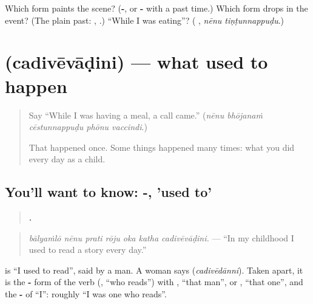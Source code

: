 \begin{tcolorbox}[breakable,colback=teal!4,colframe=teal!35!black,title={Before you move on}]
Which form paints the scene? (\textbf{-}, or \textbf{-} with a past time.) Which form drops in the event? (The plain past: \textbf{}, \textbf{}.) \textquotedblleft{}While I was eating\textquotedblright{}? (\textbf{ }, \emph{nēnu tiṇṭunnappuḍu}.)
\end{tcolorbox}
\section[\texorpdfstring{\te{చదివేవాడిని} (cadivēvāḍini)}{చదివేవాడిని (cadivēvāḍini)}]{ (cadivēvāḍini) — what used to happen}

\label{lesson:TE-C316-cadivevadini}



\begin{quote}
Say \textquotedblleft{}While I was having a meal, a call came.\textquotedblright{} (\emph{nēnu bhōjanaṁ cēstunnappuḍu phōnu vaccindi}.)

That happened once. Some things happened many times: what you did every day as a child.
\end{quote}

\subsection*{You'll want to know: -, 'used to'}
\begin{quote}
\textbf{      .}
\end{quote}

\begin{quote}
\emph{bālyaṁlō nēnu prati rōju oka katha cadivēvāḍini.} — \textquotedblleft{}In my childhood I used to read a story every day.\textquotedblright{}
\end{quote}

\textbf{} is \textquotedblleft{}I used to read\textquotedblright{}, said by a man. A woman says \textbf{} (\emph{cadivēdānni}). Taken apart, it is the \textbf{-} form of the verb (\textbf{}, \textquotedblleft{}who reads\textquotedblright{}) with \textbf{}, \textquotedblleft{}that man\textquotedblright{}, or \textbf{}, \textquotedblleft{}that one\textquotedblright{}, and the \textbf{-} of \textquotedblleft{}I\textquotedblright{}: roughly \textquotedblleft{}I was one who reads\textquotedblright{}.

